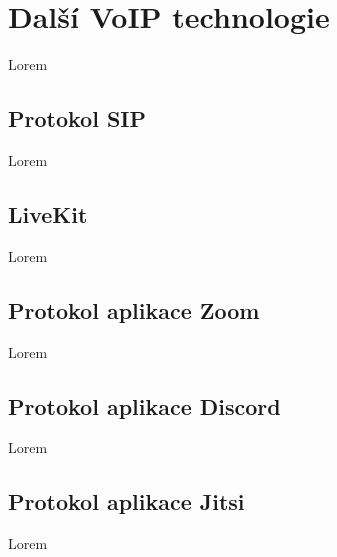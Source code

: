 \section{Další VoIP technologie}

Lorem

\subsection{Protokol SIP}

Lorem

\subsection{LiveKit}

Lorem

\subsection{Protokol aplikace Zoom}

Lorem

\subsection{Protokol aplikace Discord}

Lorem

\subsection{Protokol aplikace Jitsi}

Lorem
